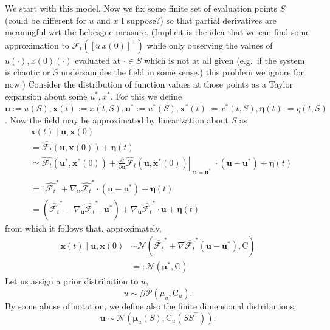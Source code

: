 \documentclass{article}
\newcommand{\vv}[1]{\boldsymbol{#1}}
\newcommand{\mm}[1]{\mathrm{#1}}
\newcommand{\dist}[1]{\mathcal{#1}}
\newcommand{\set}[1]{#1}
\newcommand{\gvn}{\mid}
\begin{document}
We start with this model.
Now we fix some finite set of evaluation points $\set{S}$ (could be different for $u$ and $x$ I suppose?) so that partial derivatives are meaningful wrt the Lebesgue measure.
(Implicit  is the idea that we can find some approximation to \(\mathcal{F}_{t}([u\,x(0)]^\top)\) while only observing the values of \(u(\cdot),x(0)(\cdot)\) evaluated at \(\cdot \in \set{S}\) which is not at all given (e.g.~if the system is chaotic or \(\set{S}\) undersamples the field in some sense.)
this problem we ignore for now.)
Consider the distribution of function values at those points as a Taylor expansion about some \(u^*,x^*\).
For this we define \(\vv{u}:=u(\set{S}),\vv{x}(t):=x(t, \set{S}),\vv{u}^*:=u^*(\set{S}),\vv{x}^*(t):=x^*(t, \set{S}),\vv{\eta}(t):=\eta(t,\set{S})\).
Now the field may be approximated by linearization about $\set{S}$ as
\begin{align}
&\vv{x}(t)\gvn \vv{u}, \vv{x}(0)\\
&=\widehat{\mathcal{F}_{t}}\left(\vv{u},\vv{x}(0)\right)+\vv{\eta}(t)\\
&\simeq\widehat{\mathcal{F}_{t}}\left(\vv{u}^*,\vv{x}^*(0)\right)
+\left.\frac{\partial}{\partial \vv{u}}
  \widehat{\mathcal{F}}_{t}\left(
    \vv{u},\vv{x}^*(0)
  \right)\right|_{\substack{\vv{u}=\vv{u}^*}}
  \cdot (\vv{u}-\vv{u}^*)
  +\vv{\eta}(t)\\
&=:\widehat{\mathcal{F}_{t}}^*
+ \nabla_{\vv{u}} \widehat{\mathcal{F}_{t}}^*
  \cdot (\vv{u}-\vv{u}^*)
  +\vv{\eta}(t)\\
&=\left(\widehat{\mathcal{F}_{t}}^*
  -\nabla_{\vv{u}} \widehat{\mathcal{F}_{t}}^*\cdot \vv{u}^*\right)
  +\nabla_{\vv{u}} \widehat{\mathcal{F}_{t}}^*\cdot \vv{u}
  +\vv{\eta}(t)
\end{align}
from which it follows that, approximately,
\begin{align}
\vv{x}(t)\gvn \vv{u}, \vv{x}(0)
&\sim \dist{N}\left(\widehat{\mathcal{F}_{t}}^*
+ \nabla \widehat{\mathcal{F}_{t}}^*
  (\vv{u}-\vv{u}^*),
  \mm{C}\right)\\
&=: \dist{N}\left(\vv{\mu}^*, \mm{C}\right)\end{align}
Let us assign a prior distribution to \(u\),
\[u\sim \dist{GP}(\mu_u,\mm{C}_u).\]
By some abuse of notation, we define also the finite dimensional distributions,
\[\vv{u}\sim \dist{N}(\vv{\mu}_u(\set{S}),\vv{\mm{C}}_u(\set{S}\set{S}^\top)).\]
\end{document}
